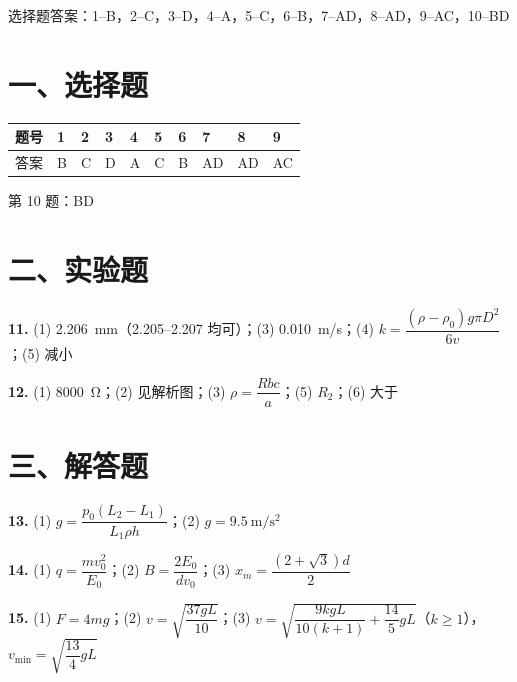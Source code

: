 
\begin{gknotice}
  选择题答案：1--B，2--C，3--D，4--A，5--C，6--B，7--AD，8--AD，9--AC，10--BD
\end{gknotice}

\section*{一、选择题}

\noindent
\begin{tabular}{@{}llllllllll@{}}
\toprule
题号 & 1 & 2 & 3 & 4 & 5 & 6 & 7 & 8 & 9\\
\midrule
答案 & B & C & D & A & C & B & AD & AD & AC\\
\bottomrule
\end{tabular}

\smallskip

\noindent
第 10 题：BD

\section*{二、实验题}

\noindent
\textbf{11.} (1) 2.206~mm（2.205--2.207 均可）；\quad(3) 0.010~m/s；\quad(4) $k=\dfrac{(\rho-\rho_{0})g\pi D^{2}}{6v}$；\quad(5) 减小

\smallskip

\noindent
\textbf{12.} (1) 8000~Ω；\quad(2) 见解析图；\quad(3) $\rho=\dfrac{Rbc}{a}$；\quad(5) $R_{2}$；\quad(6) 大于

\section*{三、解答题}

\noindent
\textbf{13.} (1) $g=\dfrac{p_{0}(L_{2}-L_{1})}{L_{1}\rho h}$；\quad(2) $g=\SI{9.5}{\metre\per\second\squared}$

\smallskip

\noindent
\textbf{14.} (1) $q=\dfrac{mv_{0}^{2}}{E_{0}}$；\quad(2) $B=\dfrac{2E_{0}}{dv_{0}}$；\quad(3) $x_{m}=\dfrac{(2+\sqrt{3})d}{2}$

\smallskip

\noindent
\textbf{15.} (1) $F=4mg$；\quad(2) $v=\sqrt{\dfrac{37gL}{10}}$；\quad(3) $v=\sqrt{\dfrac{9kgL}{10(k+1)}+\dfrac{14}{5}gL}$（$k\ge1$），
\qquad $v_{\min}=\sqrt{\dfrac{13}{4}gL}$
